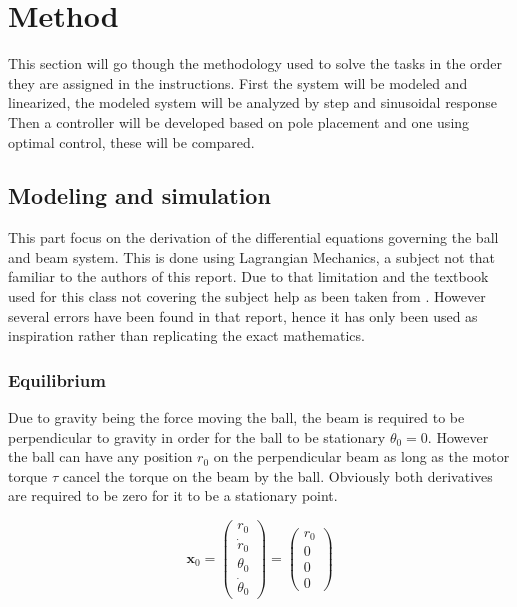 \documentclass[a4paper, titlepage]{article}
\begin{document}
\section{Method}
This section will go though the methodology used to solve the tasks in the order they are assigned in the instructions.
First the system will be modeled and linearized, the modeled system will be analyzed by step and sinusoidal response
Then a controller will be developed based on pole placement and one using optimal control, these will be compared.

\subsection{Modeling and simulation}
This part focus on the derivation of the differential equations governing the ball and beam system.
This is done using Lagrangian Mechanics, a subject not that familiar to the authors of this report.
Due to that limitation and the textbook used for this class not covering the subject help as been taken from \citep{BolvarVincenty2014ModellingTB}.
However several errors have been found in that report, hence it has only been used as inspiration rather than replicating the exact mathematics.

\subsubsection{Equilibrium}
Due to gravity being the force moving the ball, the beam is required to be perpendicular to gravity in order for the ball to be stationary $\theta_0 = 0$.
However the ball can have any position $r_0$ on the perpendicular beam as long as the motor torque $\tau$ cancel the torque on the beam by the ball.
Obviously both derivatives are required to be zero for it to be a stationary point.

\begin{equation}
\textbf{x}_0 = 
\begin{pmatrix}
r_0 \\ \dot{r}_0 \\ \theta_0 \\ \dot{\theta}_0
\end{pmatrix} = 
\begin{pmatrix}
r_0 \\ 0 \\ 0 \\ 0
\end{pmatrix}
\label{equ:stateEqulibrium}
\end{equation}
\end{document}
